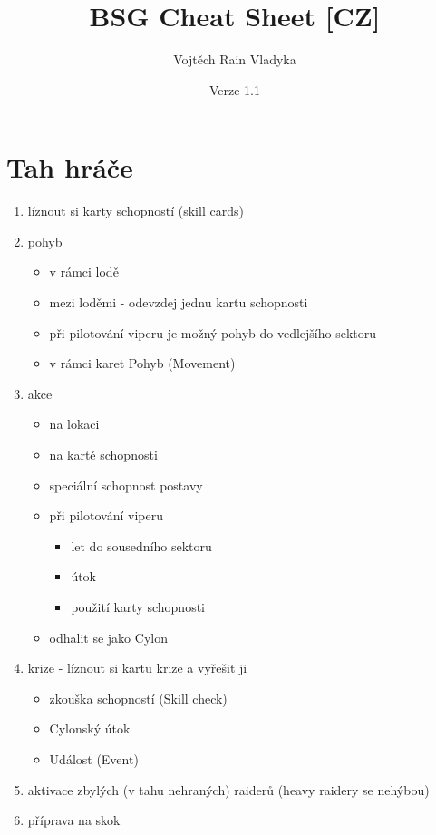 \documentclass[a4paper,twocolumn]{article}
\begin{document}

\title{BSG Cheat Sheet [CZ]}
\author{Vojtěch Rain Vladyka}
\date{Verze 1.1}

\maketitle

\section{Tah hráče}
\begin{enumerate}
\item líznout si karty schopností (skill cards)
\item pohyb 
	\begin{itemize}
	\item v rámci lodě 
	\item mezi loděmi - odevzdej jednu kartu schopnosti
	\item při pilotování viperu je možný pohyb do vedlejšího sektoru
	\item v rámci karet Pohyb (Movement)
	\end{itemize}
\item akce 
	\begin{itemize}
	\item na lokaci
	\item na kartě schopnosti
	\item speciální schopnost postavy
	\item při pilotování viperu
		\begin{itemize}
		\item let do sousedního sektoru
		\item útok
		\item použití karty schopnosti
		\end{itemize}
	\item odhalit se jako Cylon
	\end{itemize}
\item krize - líznout si kartu krize a vyřešit ji
	\begin{itemize}
	\item zkouška schopností (Skill check)
	\item Cylonský útok
	\item Událost (Event)
	\end{itemize}
\item aktivace zbylých (v tahu nehraných) raiderů (heavy raidery se nehýbou)
\item příprava na skok
\end{enumerate}
\end{document}

